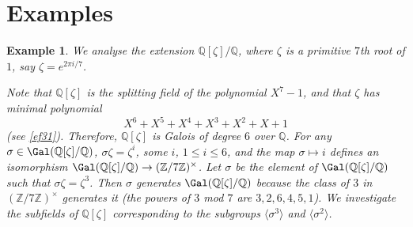 \documentclass[a4paper,11pt,final,openany]{memoir}
\newtheorem{example}[X]{Example}
\theoremstyle{nonumberplain}
\begin{document}
\section{Examples}

\begin{example}
\label{ft19}We analyse the extension $\mathbb{Q}[\zeta]/\mathbb{Q}$, where
$\zeta$ is a primitive $7$th root of $1$, say $\zeta=e^{2\pi i/7}$.

Note that $\mathbb{Q}[\zeta]$ is the splitting field of the polynomial
$X^{7}-1$, and that $\zeta$ has minimal polynomial
\[
X^{6}+X^{5}+X^{4}+X^{3}+X^{2}+X+1
\]
(see \ref{ef31}). Therefore, $\mathbb{Q}{}[\zeta]$ is Galois of degree $6$
over $\mathbb{Q}$. For any $\sigma\in \Gal(\mathbb{Q}[\zeta]/\mathbb{Q})$, $\sigma\zeta=\zeta^{i}$, some $i$,
$1\leq i\leq6$, and the map $\sigma\mapsto i$ defines an isomorphism
$\Gal(\mathbb{Q}[\zeta]/\mathbb{Q})\rightarrow(\mathbb{Z}/7\mathbb{Z}%
)^{\times}$. Let $\sigma$ be the element of $\Gal(\mathbb{Q}[\zeta
]/\mathbb{Q})$ such that $\sigma\zeta=\zeta^{3}$. Then $\sigma$ generates
$\Gal(\mathbb{Q}[\zeta]/\mathbb{Q})$ because the class of $3$ in
$(\mathbb{Z}/7\mathbb{Z})^{\times}$ generates it (the powers of $3$ mod $7$
are $3,2,6,4,5,1$). We investigate the subfields of $\mathbb{Q}[\zeta]$
corresponding to the subgroups $\langle{}\sigma^{3}\rangle$ and $\langle
{}\sigma^{2}\rangle$.

\begin{minipage}{2.5in}
\end{minipage}



\end{example}
\end{document}

